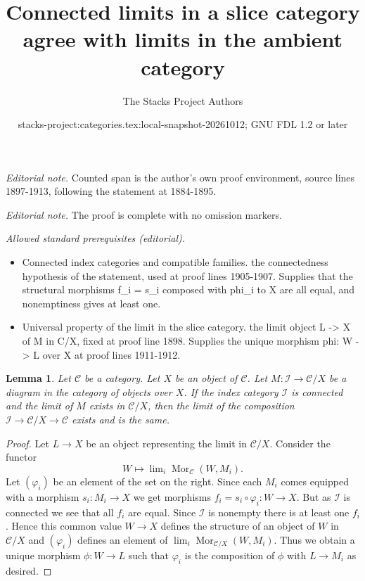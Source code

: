 \documentclass{stacks-project}
\title{Connected limits in a slice category agree with limits in the ambient category}
\author{The Stacks Project Authors}
\date{stacks-project:categories.tex:local-snapshot-20261012; GNU FDL 1.2 or later}
\theoremstyle{plain}
\newtheorem{lemma}[subsection]{Lemma}
\theoremstyle{definition}
\theoremstyle{remark}
\numberwithin{equation}{subsection}
\def\lim{\mathop{\mathrm{lim}}\nolimits}
\def\Mor{\mathop{\mathrm{Mor}}\nolimits}
\begin{document}
\maketitle
\noindent\textit{Editorial note.} Counted span is the author's own proof environment, source lines 1897-1913, following the statement at 1884-1895.\par\medskip
\noindent\textit{Editorial note.} The proof is complete with no omission markers.\par\medskip
\noindent\textit{Allowed standard prerequisites (editorial).}\begin{itemize}
\item Connected index categories and compatible families. the connectedness hypothesis of the statement, used at proof lines 1905-1907. Supplies that the structural morphisms f\_i = s\_i composed with phi\_i to X are all equal, and nonemptiness gives at least one.
\item Universal property of the limit in the slice category. the limit object L -> X of M in C/X, fixed at proof line 1898. Supplies the unique morphism phi: W -> L over X at proof lines 1911-1912.
\end{itemize}\medskip
\begin{lemma}
\label{lemma-connected-limit-over-X}
Let $\mathcal{C}$ be a category.
Let $X$ be an object of $\mathcal{C}$.
Let $M : \mathcal{I} \to \mathcal{C}/X$ be a diagram
in the category of objects over $X$.
If the index category $\mathcal{I}$ is connected
and the limit of $M$ exists in $\mathcal{C}/X$,
then the limit of the composition
$\mathcal{I} \to \mathcal{C}/X \to \mathcal{C}$
exists and is the same.
\end{lemma}

\begin{proof}
Let $L \to X$ be an object representing the limit in $\mathcal{C}/X$.
Consider the functor
$$
W \longmapsto \lim_i \Mor_\mathcal{C}(W, M_i).
$$
Let $(\varphi_i)$ be an element of the set on the right.
Since each $M_i$ comes equipped with a morphism $s_i : M_i \to X$ we
get morphisms $f_i = s_i \circ \varphi_i : W \to X$. But as $\mathcal{I}$
is connected we see that all $f_i$ are equal. Since $\mathcal{I}$
is nonempty there is at least one $f_i$.
Hence this common value $W \to X$ defines the structure of an
object of $W$ in $\mathcal{C}/X$ and $(\varphi_i)$ defines an
element of $\lim_i \Mor_{\mathcal{C}/X}(W, M_i)$.
Thus we obtain a unique morphism $\phi : W \to L$ such that
$\varphi_i$ is the composition of $\phi$ with $L \to M_i$ as desired.
\end{proof}
\end{document}
